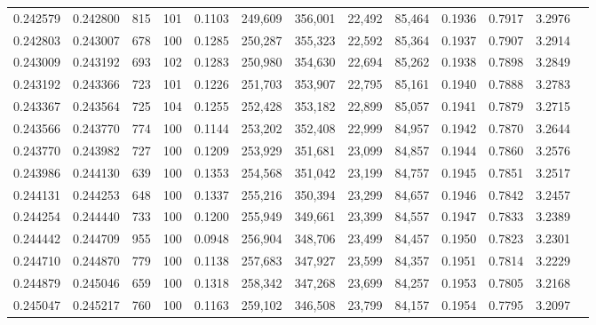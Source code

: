 \begin{tabular}{rrrrrrrrrrrrr}
0.242579 & 0.242800 &   815 & 101 &                                     0.1103 & 249,609 & 356,001 &  22,492 &  85,464 & 0.1936 & 0.7917 & 3.2976 \\
0.242803 & 0.243007 &   678 & 100 &                                     0.1285 & 250,287 & 355,323 &  22,592 &  85,364 & 0.1937 & 0.7907 & 3.2914 \\
0.243009 & 0.243192 &   693 & 102 &                                     0.1283 & 250,980 & 354,630 &  22,694 &  85,262 & 0.1938 & 0.7898 & 3.2849 \\
0.243192 & 0.243366 &   723 & 101 &                                     0.1226 & 251,703 & 353,907 &  22,795 &  85,161 & 0.1940 & 0.7888 & 3.2783 \\
0.243367 & 0.243564 &   725 & 104 &                                     0.1255 & 252,428 & 353,182 &  22,899 &  85,057 & 0.1941 & 0.7879 & 3.2715 \\
0.243566 & 0.243770 &   774 & 100 &                                     0.1144 & 253,202 & 352,408 &  22,999 &  84,957 & 0.1942 & 0.7870 & 3.2644 \\
0.243770 & 0.243982 &   727 & 100 &                                     0.1209 & 253,929 & 351,681 &  23,099 &  84,857 & 0.1944 & 0.7860 & 3.2576 \\
0.243986 & 0.244130 &   639 & 100 &                                     0.1353 & 254,568 & 351,042 &  23,199 &  84,757 & 0.1945 & 0.7851 & 3.2517 \\
0.244131 & 0.244253 &   648 & 100 &                                     0.1337 & 255,216 & 350,394 &  23,299 &  84,657 & 0.1946 & 0.7842 & 3.2457 \\
0.244254 & 0.244440 &   733 & 100 &                                     0.1200 & 255,949 & 349,661 &  23,399 &  84,557 & 0.1947 & 0.7833 & 3.2389 \\
0.244442 & 0.244709 &   955 & 100 &                                     0.0948 & 256,904 & 348,706 &  23,499 &  84,457 & 0.1950 & 0.7823 & 3.2301 \\
0.244710 & 0.244870 &   779 & 100 &                                     0.1138 & 257,683 & 347,927 &  23,599 &  84,357 & 0.1951 & 0.7814 & 3.2229 \\
0.244879 & 0.245046 &   659 & 100 &                                     0.1318 & 258,342 & 347,268 &  23,699 &  84,257 & 0.1953 & 0.7805 & 3.2168 \\
0.245047 & 0.245217 &   760 & 100 &                                     0.1163 & 259,102 & 346,508 &  23,799 &  84,157 & 0.1954 & 0.7795 & 3.2097 \\

\end{tabular}
